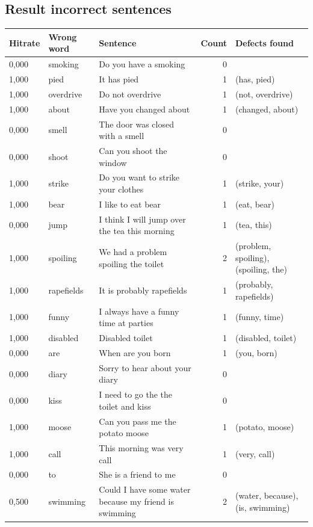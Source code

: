 \documentclass[a4paper,12pt]{article}
\begin{document}



\begin{landscape}
\fontsize{10}{11}\selectfont
\centering
\appendix
\section{Result incorrect sentences}
\label{appendix:A}
\pagestyle{empty}
\begin{longtable}{l l l r l}
Hitrate & Wrong word & Sentence & Count & Defects found \\
\hline
0,000 & smoking & Do you have a smoking & 0 &  \\
1,000 & pied & It has pied & 1 & (has, pied) \\
1,000 & overdrive & Do not overdrive & 1 & (not, overdrive) \\
1,000 & about & Have you changed about & 1 & (changed, about) \\
0,000 & smell & The door was closed with a smell & 0 &  \\
0,000 & shoot & Can you shoot the window & 0 &  \\
1,000 & strike & Do you want to strike your clothes & 1 & (strike, your) \\
1,000 & bear & I like to eat bear & 1 & (eat, bear) \\
0,000 & jump & I think I will jump over the tea this morning & 1 & (tea, this) \\
1,000 & spoiling & We had a problem spoiling the toilet & 2 & (problem, spoiling), (spoiling, the) \\
1,000 & rapefields & It is probably rapefields & 1 & (probably, rapefields) \\
1,000 & funny & I always have a funny time at parties & 1 & (funny, time) \\
1,000 & disabled & Disabled toilet & 1 & (disabled, toilet) \\
0,000 & are & When are you born & 1 & (you, born) \\
0,000 & diary & Sorry to hear about your diary & 0 &  \\
0,000 & kiss & I need to go the the toilet and kiss & 0 &  \\
1,000 & moose & Can you pass me the potato moose & 1 & (potato, moose) \\
1,000 & call & This morning was very call & 1 & (very, call) \\
0,000 & to & She is a friend to me & 0 &  \\
0,500 & swimming & Could I have some water because my friend is swimming & 2 & (water, because), (is, swimming) \\

\end{longtable}
\end{landscape}
\end{document}
